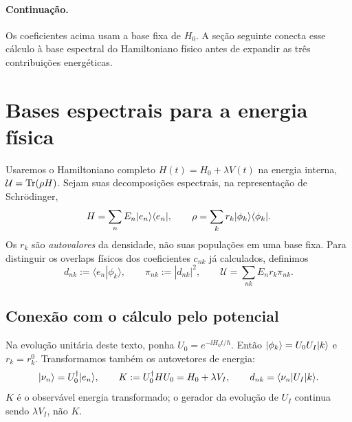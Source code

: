 \paragraph{Continuação.}
Os coeficientes acima usam a base fixa de $H_0$.
A seção seguinte conecta esse cálculo à base espectral do Hamiltoniano
físico antes de expandir as três contribuições energéticas.


\section{Bases espectrais para a energia física}
Usaremos o Hamiltoniano completo $H(t)=H_0+\lambda V(t)$ na energia
interna, $\mathcal U=\operatorname{Tr}(\rho H)$.
Sejam suas decomposições espectrais, na representação de Schrödinger,
\begin{equation}
 H=\sum_n E_n\lvert e_n\rangle\langle e_n\rvert,\qquad
 \rho=\sum_k r_k\lvert \phi_k\rangle\langle \phi_k\rvert.
 \label{eq:spectra}
\end{equation}
Os $r_k$ são \emph{autovalores} da densidade, não suas populações em
uma base fixa. Para distinguir os overlaps físicos dos coeficientes
$c_{nk}$ já calculados, definimos
\begin{equation}
 d_{nk}:=\langle e_n|\phi_k\rangle,\qquad
 \pi_{nk}:=|d_{nk}|^2,\qquad
 \mathcal U=\sum_{nk}E_nr_k\pi_{nk}.
 \label{eq:physicaloverlap}
\end{equation}

\subsection{Conexão com o cálculo pelo potencial}
Na evolução unitária deste texto, ponha $U_0=e^{-\ii H_0t/\hbar}$.
Então $\lvert \phi_k\rangle=U_0U_I\lvert k\rangle$ e $r_k=r_k^0$.
Transformamos também os autovetores de energia:
\begin{equation}
 \lvert \nu_n\rangle=U_0^\dagger\lvert e_n\rangle,\qquad
 K:=U_0^\dagger HU_0=H_0+\lambda V_I,\qquad
 d_{nk}=\langle \nu_n\rvert U_I\lvert k\rangle.
 \label{eq:K}
\end{equation}
$K$ é o observável energia transformado; o gerador da evolução de
$U_I$ continua sendo $\lambda V_I$, não $K$.

